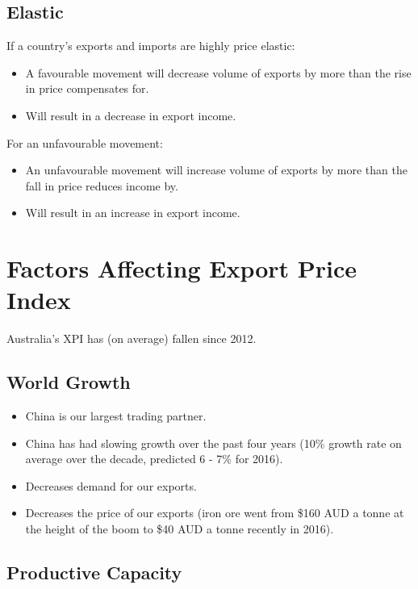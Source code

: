 \documentclass[a4paper,11pt]{article}
\begin{document}
\subsection{Elastic}

If a country's exports and imports are highly price elastic:

\begin{itemize}
\item A favourable movement will decrease volume of exports by more than the
	rise in price compensates for.
\item Will result in a decrease in export income.
\end{itemize}

For an unfavourable movement:

\begin{itemize}
\item An unfavourable movement will increase volume of exports by more than the
	fall in price reduces income by.
\item Will result in an increase in export income.
\end{itemize}




\section{Factors Affecting Export Price Index}

Australia's XPI has (on average) fallen since 2012.


\subsection{World Growth}

\begin{itemize}
\item China is our largest trading partner.
\item China has had slowing growth over the past four years (10\% growth rate
	on average over the decade, predicted 6 - 7\% for 2016).
\item Decreases demand for our exports.
\item Decreases the price of our exports (iron ore went from \$160 AUD a tonne
	at the height of the boom to \$40 AUD a tonne recently in 2016).
\end{itemize}


\subsection{Productive Capacity}
\end{document}
